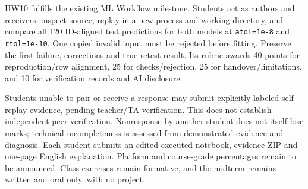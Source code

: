 HW10 fulfills the existing ML Workflow milestone. Students act as authors and receivers, inspect source, replay in a new process and working directory, and compare all 120 ID-aligned test predictions for both models at \texttt{atol=1e-8} and \texttt{rtol=1e-10}. One copied invalid input must be rejected before fitting. Preserve the first failure, corrections and true retest result. Its rubric awards 40 points for reproduction/row alignment, 25 for checks/rejection, 25 for handover/limitations, and 10 for verification records and AI disclosure.

Students unable to pair or receive a response may submit explicitly labeled self-replay evidence, pending teacher/TA verification. This does not establish independent peer verification. Nonresponse by another student does not itself lose marks; technical incompleteness is assessed from demonstrated evidence and diagnosis. Each student submits an edited executed notebook, evidence ZIP and one-page English explanation. Platform and course-grade percentages remain to be announced. Class exercises remain formative, and the midterm remains written and oral only, with no project.
